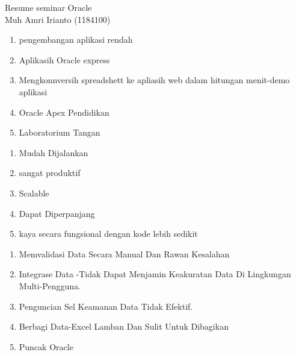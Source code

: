 \documentclass[12pt, times news roman, a4paper] {article}
\begin{document}
\begin{center}
\large{Resume seminar Oracle}\\

\noindent Muh Amri Irianto (1184100)

\end{center}

\begin {enumerate}
\section{Pembahasan}
\item pengembangan aplikasi rendah
\item Aplikasih Oracle express
\item Mengkonnversih spreadshett ke apliasih web dalam hitungan menit-demo aplikasi 
\item Oracle Apex Pendidikan
\item Laboratorium Tangan
\end{enumerate}

\begin{enumerate}
\section{Apa itu Kode Rendah?}
\item Mudah Dijalankan
\item sangat produktif
\item Scalable
\item Dapat Diperpanjang
\item kaya secara fungsional dengan kode lebih sedikit
\end{enumerate}

\begin {enumerate}
\section{Mengelola Data Dalam Spreadsheet}
\item  Memvalidasi Data Secara Manual Dan Rawan Kesalahan
\item  Integrase Data -Tidak Dapat Menjamin Keakuratan Data 	Di Lingkungan Multi-Pengguna.
\item  Penguncian Sel Keamanan Data Tidak Efektif.
\item  Berbagi Data-Excel Lamban Dan Sulit Untuk Dibagikan
\item  Puncak Oracle
\end{enumerate}
\end{document}
